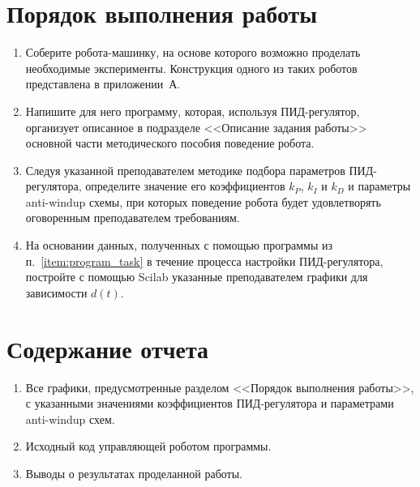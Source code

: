 \documentclass[12pt,a4paper,openany]{extarticle}
\begin{document}
\section{Порядок выполнения работы}
\begin{enumerate}
\item Соберите робота-машинку, на основе которого возможно проделать необходимые эксперименты.
Конструкция одного из таких роботов представлена в приложении~А.
\item \label{item:program_task}Напишите для него программу, которая, используя ПИД-регулятор, организует описанное в подразделе <<Описание задания работы>> основной части методического пособия поведение робота.
\item Следуя указанной преподавателем методике подбора параметров ПИД-регулятора, определите значение его коэффициентов $k_P$, $k_I$ и $k_D$ и параметры anti-windup схемы, при которых поведение робота будет удовлетворять оговоренным преподавателем требованиям.
\item На основании данных, полученных с помощью программы из п.~\ref{item:program_task} в течение процесса настройки ПИД-регулятора, постройте с помощью Scilab указанные преподавателем графики для зависимости $d(t)$.
\end{enumerate}

\section{Содержание отчета}
\begin{enumerate}
\item Все графики, предусмотренные разделом <<Порядок выполнения работы>>, с указанными значениями коэффициентов ПИД-регулятора и параметрами anti-windup схем.
\item Исходный код управляющей роботом программы.
\item Выводы о результатах проделанной работы.
\end{enumerate}

\newpage
\end{document}
